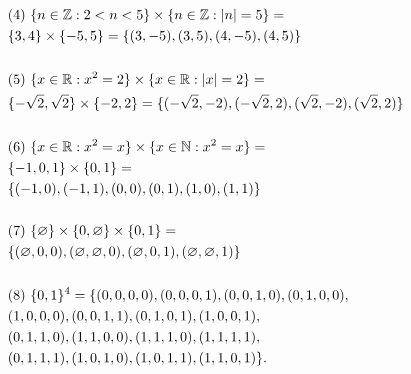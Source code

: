\begin{solution}
$$\begin{aligned}
    &(4)~ \{ n\in\mathbb{Z}:2<n<5 \}\times \{ n\in\mathbb{Z}:\lvert n \rvert=5 \}=\\
    &\{ 3,4 \}\times \{ -5,5 \}=\{ (3,-5),(3,5),(4,-5),(4,5) \}\\\\
    &(5)~\{ x\in\mathbb{R}:x^2=2 \}\times \{ x\in\mathbb{R}:\lvert x \rvert=2 \}=\\
    &\{ -\sqrt2,\sqrt 2 \}\times \{ -2,2 \}= \{ (-\sqrt 2,-2),(-\sqrt 2,2),(\sqrt 2,-2),(\sqrt 2,2) \}\\\\
    &(6)~\{ x\in\mathbb{R}:x^2=x \}\times \{ x\in\mathbb{N}:x^2=x \}=\\
    &\{ -1,0,1 \}\times \{ 0,1 \}=\\
    &\{ (-1,0),(-1,1),(0,0),(0,1),(1,0),(1,1) \}\\\\
    &(7)~\{ \varnothing \}\times \{ 0,\varnothing \}\times \{ 0,1 \}=\\
    &\{ (\varnothing ,0,0),(\varnothing,\varnothing, 0),( \varnothing ,0,1),( \varnothing , \varnothing, 1) \}\\\\
    &(8)~\{ 0,1 \}{^4}=\{(0,0,0,0),(0,0,0,1),(0,0,1,0),(0,1,0,0),\\
    &(1,0,0,0),(0,0,1,1),(0,1,0,1),(1,0,0,1),\\
    &(0,1,1,0),(1,1,0,0),(1,1,1,0),(1,1,1,1),\\
    &(0,1,1,1),(1,0,1,0), (1,0,1,1),(1,1,0,1)\}.
\end{aligned}
$$


\end{solution}
